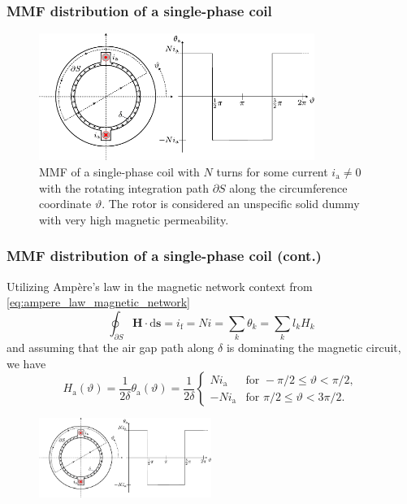 \begin{frame}
	\frametitle{MMF distribution of a single-phase coil}
    \begin{figure}
            \centering
            \includegraphics[width=0.8\textwidth]{fig/lec05/MMF_single_phase.pdf}
            \caption{MMF of a single-phase coil with $N$ turns for some current $i_\mathrm{a} \neq 0$ with the rotating integration path $\partial S$  along the circumference coordinate $\vartheta$. The rotor is considered an unspecific solid dummy with very high magnetic permeability.}
            \label{fig: MMF_single_phase}
    \end{figure}
\end{frame}

\begin{frame}
	\frametitle{MMF distribution of a single-phase coil (cont.)}
			Utilizing Amp\`ere's law in the magnetic network context from \eqref{eq:ampere_law_magnetic_network}
            $$ \oint_{\partial S} \bm{H} \cdot \mathrm{d}\bm{s} = i_{\mathrm{f}} = N i = \sum_k  \theta_k = \sum_k l_k H_k $$
            and assuming that the air gap path along $\delta$ is dominating the magnetic circuit, we have
            \begin{equation}
                H_\mathrm{a}(\vartheta) = \frac{1}{2\delta} \theta_\mathrm{a}(\vartheta) = \frac{1}{2\delta} \begin{cases}
                    N i_\mathrm{a} & \text{for } -\pi/2 \leq \vartheta < \pi/2, \\
                    -N i_\mathrm{a} & \text{for } \pi/2 \leq \vartheta < 3\pi/2.
                \end{cases}
            \end{equation}
            \begin{figure}
                \centering
                \includegraphics[width=0.5\textwidth]{fig/lec05/MMF_single_phase.pdf}
            \end{figure}
\end{frame}

